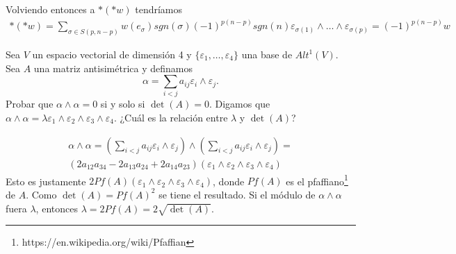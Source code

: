 \documentclass[twoside]{article}
\begin{document}
\begin{solucion}
Volviendo entonces a $*(*w)$ tendríamos
\begin{gather*}
*(*w)=\sum_{\sigma\in S(p,n-p)}w(e_{\sigma})sgn(\sigma)(-1)^{p(n-p)}sgn(n)\varepsilon_{\sigma(1)}\land\dots\land\varepsilon_{\sigma(p)}=(-1)^{p(n-p)}w
\end{gather*}
\end{solucion}

\newpage

\begin{ejercicio}{2.10}
Sea $V$ un espacio vectorial de dimensión 4 y $\{\varepsilon_1,\dots,\varepsilon_4\}$ una base de $Alt^1(V)$. Sea $A$ una matriz antisimétrica y definamos
\[
\alpha=\sum_{i<j}a_{ij}\varepsilon_i\land\varepsilon_j.
\]
Probar que $\alpha\land\alpha=0$ si y solo si $\det(A)=0$.  Digamos que $\alpha\land\alpha=\lambda\varepsilon_1\land\varepsilon_2\land\varepsilon_3\land\varepsilon_4$. ¿Cuál es la relación entre $\lambda$ y $\det(A)$?
\end{ejercicio}
\begin{solucion}
\begin{gather*}
\alpha\land\alpha=(\sum_{i<j}a_{ij}\varepsilon_i\land\varepsilon_j)\land (\sum_{i<j}a_{ij}\varepsilon_i\land\varepsilon_j)=\\
(2a_{12}a_{34}-2a_{13}a_{24}+2a_{14}a_{23})(\varepsilon_1\land\varepsilon_2\land\varepsilon_3\land\varepsilon_4)
\end{gather*}
Esto es justamente $2Pf(A)(\varepsilon_1\land\varepsilon_2\land\varepsilon_3\land\varepsilon_4)$, donde $Pf(A)$ es el pfaffiano\footnote{https://en.wikipedia.org/wiki/Pfaffian} de $A$. Como $\det(A)=Pf(A)^2$ se tiene el resultado. Si el módulo de $\alpha\land\alpha$ fuera $\lambda$, entonces $\lambda=2Pf(A)=2\sqrt{\det(A)}$. 
\end{solucion}

\newpage
\end{document}
